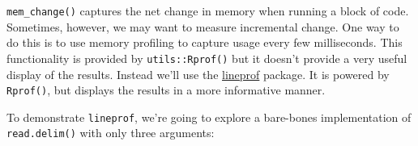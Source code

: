 \begin{Shaded}
\begin{Highlighting}[]
\StringTok{ }
  \StringTok{ }\NormalTok{:}
\NormalTok{\}}
\StringTok{ }\NormalTok{())}

\StringTok{ }
  \StringTok{ }\NormalTok{:}
  \StringTok{ }
\NormalTok{\}}
\StringTok{ }\NormalTok{())}

\StringTok{ }
  \StringTok{ }\NormalTok{:}
\NormalTok{\}}
\StringTok{ }\NormalTok{())}
\end{Highlighting}
\end{Shaded}


\texttt{mem\_change()} captures the net change in memory when running a
block of code. Sometimes, however, we may want to measure incremental
change. One way to do this is to use memory profiling to capture usage
every few milliseconds. This functionality is provided by
\texttt{utils::Rprof()} but it doesn't provide a very useful display of
the results. Instead we'll use the
\href{https://github.com/hadley/lineprof}{lineprof} package. It is
powered by \texttt{Rprof()}, but displays the results in a more
informative manner. 

To demonstrate \texttt{lineprof}, we're going to explore a bare-bones
implementation of \texttt{read.delim()} with only three arguments:

